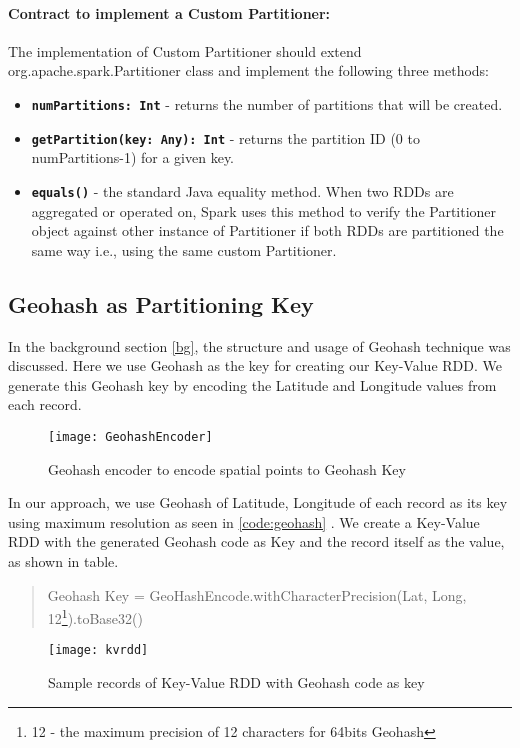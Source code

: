 \documentclass[article,type=msc,colorback,12pt,accentcolor=tud1d]{tudthesis}
\begin{document}
		\paragraph{	Contract to implement a Custom Partitioner: }
			The implementation of Custom Partitioner should extend org.apache.spark.Partitioner class and implement the following three methods:\cite{sparkbook}
			
			\begin{itemize}
				\item \textbf{\texttt{numPartitions: Int}} - returns the number of partitions that will be created.
				\item \textbf{\texttt{getPartition(key: Any): Int}} - returns the partition ID (0 to numPartitions-1) for a given key.
				\item \textbf{\texttt{equals()}} - the standard Java equality method. When two RDDs are aggregated or operated on, Spark uses this method to verify the Partitioner object against other instance of Partitioner if both RDDs are partitioned the same way i.e., using the same custom Partitioner.
			\end{itemize}
			\clearpage
		\subsection{Geohash as Partitioning Key}
			\par In the background section \ref{bg}, the structure and usage of Geohash technique was discussed. Here we use Geohash as the key for creating our Key-Value RDD. We generate this Geohash key by encoding the Latitude and Longitude values from each record. \\
						
				\begin{figure}[h]
					\centering
					\texttt{[image: GeohashEncoder]}
					\caption{Geohash encoder to encode spatial points to Geohash Key}
					\label{fig:GeohashEncoder}
				\end{figure}
		In our approach, we use Geohash of Latitude, Longitude of each record as its key using maximum resolution as seen in \ref{code:geohash} . We create a Key-Value RDD with the generated Geohash code as Key and the record itself as the value, as shown in table. 
		\begin{quote} \label{code:geohash}
			Geohash Key = GeoHashEncode.withCharacterPrecision(Lat, Long, 12\footnote{12 - the  maximum precision of 12 characters for 64bits Geohash}).toBase32()
		\end{quote}
				\begin{figure}[h]
					\centering
					\texttt{[image: kvrdd]}
					\caption{Sample records of Key-Value RDD with Geohash code as key}
					\label{fig:kvrdd}
				\end{figure}
				
\end{document}
